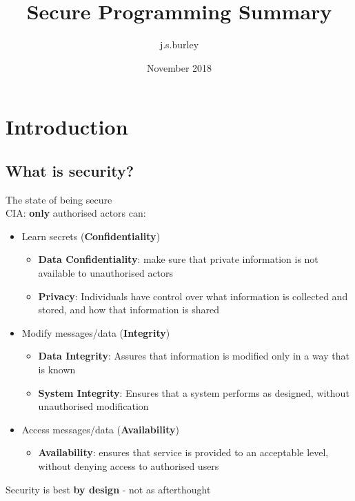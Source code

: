 \documentclass{article}
\title{Secure Programming Summary}
\author{j.s.burley }
\date{November 2018}
\begin{document}
\maketitle

\tableofcontents
\newpage
\section{Introduction}
    \subsection{What is security?}
    The state of being secure
    \\CIA: \textbf{only} authorised actors can:
    \begin{itemize}
        \item Learn secrets (\textbf{Confidentiality})
        \begin{itemize}
            \item \textbf{Data Confidentiality}: make sure that private information is not available to unauthorised actors
            \item \textbf{Privacy}: Individuals have control over what information is collected and stored, and how that information is shared
        \end{itemize}
        \item Modify messages/data (\textbf{Integrity})
        \begin{itemize}
            \item \textbf{Data Integrity}: Assures that information is modified only in a way that is known
            \item \textbf{System Integrity}: Ensures that a system performs as designed, without unauthorised modification
        \end{itemize}
        \item Access messages/data (\textbf{Availability})
        \begin{itemize}
            \item \textbf{Availability}: ensures that service is provided to an acceptable level, without denying access to authorised users
        \end{itemize}
    \end{itemize}
    Security is best \textbf{by design} - not as afterthought
\end{document}
